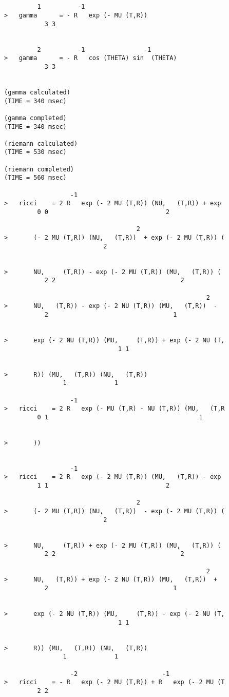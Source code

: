 \begin{verbatim}


         1          -1
>   gamma      = - R   exp (- MU (T,R))
           3 3


         2          -1                -1
>   gamma      = - R   cos (THETA) sin  (THETA)
           3 3


(gamma calculated)
(TIME = 340 msec)

(gamma completed)
(TIME = 340 msec)

(riemann calculated)
(TIME = 530 msec)

(riemann completed)
(TIME = 560 msec)

                  -1
>   ricci    = 2 R   exp (- 2 MU (T,R)) (NU,   (T,R)) + exp
         0 0                                2

                                    2
>       (- 2 MU (T,R)) (NU,   (T,R))  + exp (- 2 MU (T,R)) (
                           2


>       NU,     (T,R)) - exp (- 2 MU (T,R)) (MU,   (T,R)) (
           2 2                                  2

                                                       2
>       NU,   (T,R)) - exp (- 2 NU (T,R)) (MU,   (T,R))  -
           2                                  1


>       exp (- 2 NU (T,R)) (MU,     (T,R)) + exp (- 2 NU (T,
                               1 1


>       R)) (MU,   (T,R)) (NU,   (T,R))
                1             1

                  -1
>   ricci    = 2 R   exp (- MU (T,R) - NU (T,R)) (MU,   (T,R
         0 1                                         1


>       ))


                  -1
>   ricci    = 2 R   exp (- 2 MU (T,R)) (MU,   (T,R)) - exp
         1 1                                2

                                    2
>       (- 2 MU (T,R)) (NU,   (T,R))  - exp (- 2 MU (T,R)) (
                           2


>       NU,     (T,R)) + exp (- 2 MU (T,R)) (MU,   (T,R)) (
           2 2                                  2

                                                       2
>       NU,   (T,R)) + exp (- 2 NU (T,R)) (MU,   (T,R))  +
           2                                  1


>       exp (- 2 NU (T,R)) (MU,     (T,R)) - exp (- 2 NU (T,
                               1 1


>       R)) (MU,   (T,R)) (NU,   (T,R))
                1             1

                  -2                       -1
>   ricci    = - R   exp (- 2 MU (T,R)) + R   exp (- 2 MU (T
         2 2

\end{verbatim}
